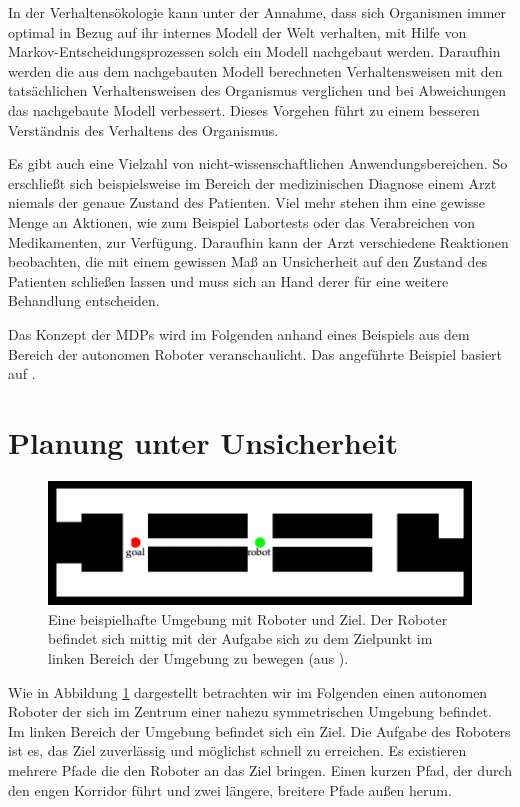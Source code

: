 \documentclass[a4paper]{IEEEtran}
\begin{document}
In der Verhaltensökologie kann unter der Annahme, dass sich Organismen immer optimal in Bezug auf ihr internes Modell der Welt verhalten, mit Hilfe von Markov-Entscheidungsprozessen solch ein Modell nachgebaut werden. Daraufhin werden die aus dem nachgebauten Modell berechneten Verhaltensweisen mit den tatsächlichen Verhaltensweisen des Organismus verglichen und bei Abweichungen das nachgebaute Modell verbessert. Dieses Vorgehen führt zu einem besseren Verständnis des Verhaltens des Organismus.

Es gibt auch eine Vielzahl von nicht-wissenschaftlichen Anwendungsbereichen. So erschließt sich beispielsweise im Bereich der medizinischen Diagnose einem Arzt niemals der genaue Zustand des Patienten. Viel mehr stehen ihm eine gewisse Menge an Aktionen, wie zum Beispiel Labortests oder das Verabreichen von Medikamenten, zur Verfügung. Daraufhin kann der Arzt verschiedene Reaktionen beobachten, die mit einem gewissen Maß an Unsicherheit auf den Zustand des Patienten schließen lassen und muss sich an Hand derer für eine weitere Behandlung entscheiden. 

Das Konzept der MDPs wird im Folgenden anhand eines Beispiels aus dem Bereich der autonomen Roboter veranschaulicht. Das angeführte Beispiel basiert auf \cite{thrun2005probabilistic}.


\section{Planung unter Unsicherheit}
\label{sec:planning}
\begin{figure}[ht]
	\centering
	\includegraphics[scale=0.72]{images/autnmRobot_basicSituation.png}
	\caption{Eine beispielhafte Umgebung mit Roboter und Ziel. Der Roboter befindet sich mittig mit der Aufgabe sich zu dem Zielpunkt im linken Bereich der Umgebung zu bewegen (aus \cite{thrun2005probabilistic}).}
	\label{fig:autnmRob_bSit}
\end{figure}

Wie in Abbildung \ref{fig:autnmRob_bSit} dargestellt betrachten wir im Folgenden einen autonomen Roboter der sich im Zentrum einer nahezu symmetrischen Umgebung befindet. Im linken Bereich der Umgebung befindet sich ein Ziel. Die Aufgabe des Roboters ist es, das Ziel zuverlässig und möglichst schnell zu erreichen. Es existieren mehrere Pfade die den Roboter an das Ziel bringen. Einen kurzen Pfad, der durch den engen Korridor führt und zwei längere, breitere Pfade außen herum.
\end{document}
